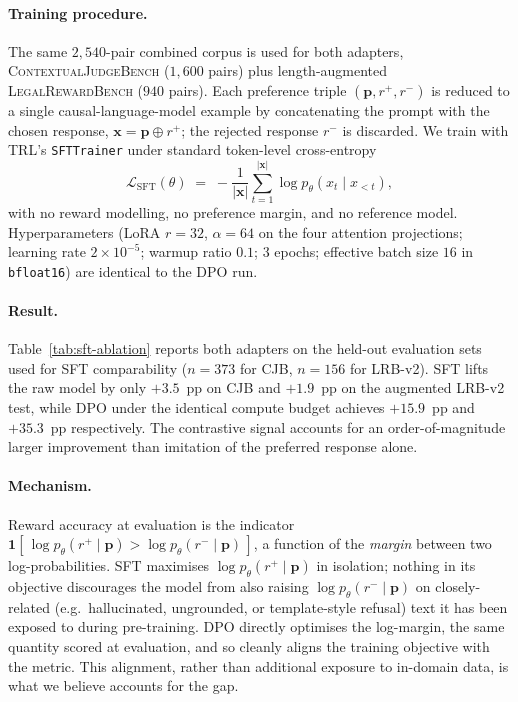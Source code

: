 \documentclass{article}
\theoremstyle{plain}
\theoremstyle{definition}
\theoremstyle{remark}
\begin{document}
\paragraph{Training procedure.}
The same $2{,}540$-pair combined corpus is used for both adapters,  \textsc{ContextualJudgeBench} ($1{,}600$ pairs) plus length-augmented \textsc{LegalRewardBench} ($940$ pairs).  Each preference triple $(\mathbf{p}, r^{+}, r^{-})$ is reduced to a single causal-language-model example by concatenating the prompt with the chosen response, $\mathbf{x} = \mathbf{p} \oplus r^{+}$; the rejected response $r^{-}$ is discarded.  We train with TRL's \texttt{SFTTrainer} under standard token-level cross-entropy
\begin{equation*}
\mathcal{L}_{\mathrm{SFT}}(\theta) \;=\; - \frac{1}{|\mathbf{x}|} \sum_{t=1}^{|\mathbf{x}|} \log p_{\theta}(x_t \mid x_{<t}),
\end{equation*}
with no reward modelling, no preference margin, and no reference model.  Hyperparameters (LoRA $r{=}32$, $\alpha{=}64$ on the four attention projections; learning rate $2{\times}10^{-5}$; warmup ratio $0.1$; $3$ epochs; effective batch size $16$ in \texttt{bfloat16}) are identical to the DPO run.

\paragraph{Result.}
Table~\ref{tab:sft-ablation} reports both adapters on the held-out evaluation sets used for SFT comparability ($n=373$ for CJB, $n=156$ for LRB-v2).  SFT lifts the raw model by only $+3.5$~pp on CJB and $+1.9$~pp on the augmented LRB-v2 test, while DPO under the identical compute budget achieves $+15.9$~pp and $+35.3$~pp respectively.  The contrastive signal accounts for an order-of-magnitude larger improvement than imitation of the preferred response alone.

\paragraph{Mechanism.}
Reward accuracy at evaluation is the indicator $\mathbf{1}[\,\log p_\theta(r^{+}\!\mid\!\mathbf{p}) > \log p_\theta(r^{-}\!\mid\!\mathbf{p})\,]$, a function of the \emph{margin} between two log-probabilities.  SFT maximises $\log p_\theta(r^{+}\!\mid\!\mathbf{p})$ in isolation; nothing in its objective discourages the model from also raising $\log p_\theta(r^{-}\!\mid\!\mathbf{p})$ on closely-related (e.g.\ hallucinated, ungrounded, or template-style refusal) text it has been exposed to during pre-training.  DPO directly optimises the log-margin,  the same quantity scored at evaluation,  and so cleanly aligns the training objective with the metric.  This alignment, rather than additional exposure to in-domain data, is what we believe accounts for the gap.
\end{document}
